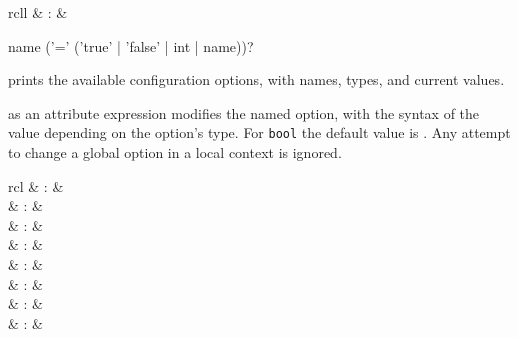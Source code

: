 \begin{isabellebody}
\begin{isamarkuptext}
  \begin{matharray}{rcll}
    \mbox{} & : &  \\
  \end{matharray}

  \begin{rail}
    name ('=' ('true' | 'false' | int | name))?
  \end{rail}

  \begin{descr}
  
  \item [\mbox{\isa{\isacommand{print{\isacharunderscore}configs}}}] prints the available
  configuration options, with names, types, and current values.
  
  \item [\isa{{\isachardoublequote}name\ {\isacharequal}\ value{\isachardoublequote}}] as an attribute expression modifies
  the named option, with the syntax of the value depending on the
  option's type.  For \verb|bool| the default value is .  Any attempt to change a global option in a local context is
  ignored.

  \end{descr}%
\end{isamarkuptext}%
\isamarkuptrue%
%
\isamarkuptrue%
%
\isamarkuptrue%
%
\begin{isamarkuptext}%
\begin{matharray}{rcl}
    \mbox{} & : & \isarmeth \\
    \mbox{} & : & \isarmeth \\
    \mbox{} & : & \isarmeth \\[0.5ex]
    \mbox{}\isa{{\isachardoublequote}\isactrlsup {\isacharasterisk}{\isachardoublequote}} & : & \isarmeth \\
    \mbox{}\isa{{\isachardoublequote}\isactrlsup {\isacharasterisk}{\isachardoublequote}} & : & \isarmeth \\
    \mbox{}\isa{{\isachardoublequote}\isactrlsup {\isacharasterisk}{\isachardoublequote}} & : & \isarmeth \\
    \mbox{} & : & \isarmeth \\
    \mbox{} & : & \isarmeth \\
  \end{matharray}


\end{isamarkuptext}
\end{isabellebody}
